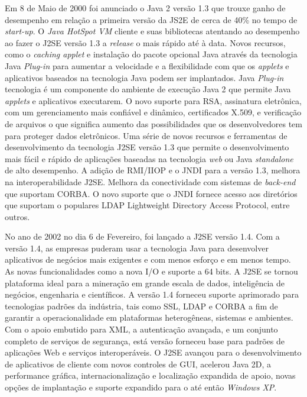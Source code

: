 Em 8 de Maio de 2000 foi anunciado o Java 2 versão 1.3 que trouxe ganho de desempenho em relação a primeira versão da JS2E de cerca de 40\%  no tempo de {\it  start-up}. O {\it Java HotSpot VM} cliente e suas bibliotecas atentando ao desempenho ao fazer o J2SE versão 1.3 a {\it release} o mais rápido até à data. Novos recursos, como o {\it caching applet} e instalação do pacote opcional Java através da tecnologia Java {\it  Plug-in} para aumentar a velocidade e a flexibilidade com que os {\it applets} e aplicativos baseados na tecnologia Java podem ser implantados. Java {\it  Plug-in} tecnologia é um componente do ambiente de execução Java 2 que permite Java {\it applets} e aplicativos executarem. O novo suporte para \acs{RSA}, assinatura eletrônica, com um gerenciamento mais confiável e dinâmico, certificados X.509, e verificação de arquivos o que significa aumento das possibilidades que os desenvolvedores tem para proteger dados eletrônicos. Uma série de novos recursos e ferramentas de desenvolvimento da tecnologia J2SE versão 1.3 que permite o desenvolvimento mais fácil e rápido de aplicações baseadas na tecnologia {\it web} ou Java {\it  standalone} de alto desempenho. A adição de RMI/IIOP e o JNDI para a versão 1.3, melhora na interoperabilidade J2SE. Melhora da conectividade com sistemas de {\it  back-end} que suportam CORBA. O novo suporte que o JNDI fornece acesso aos diretórios que suportam o populares LDAP Lightweight Directory Access Protocol, entre outros.


No ano de 2002 no dia 6 de Fevereiro, foi lançado a J2SE versão 1.4. Com a versão 1.4, as empresas puderam usar a tecnologia Java para desenvolver aplicativos de negócios mais exigentes e com menos esforço e em menos tempo. As novas funcionalidades como a nova I/O e suporte a 64 bits. A J2SE se tornou plataforma ideal para a mineração em grande escala de dados, inteligência de negócios, engenharia e científicos. A versão 1.4 forneceu suporte aprimorado para tecnologias padrões da indústria, tais como SSL, LDAP e CORBA a fim de garantir a operacionalidade em plataformas heterogêneas, sistemas e ambientes. Com o apoio embutido para XML, a autenticação avançada, e um conjunto completo de serviços de segurança, está versão forneceu base para padrões de aplicações Web e serviços interoperáveis. O J2SE avançou para o desenvolvimento de aplicativos de cliente com novos controles de GUI, acelerou Java 2D, a performance gráfica, internacionalização e localização expandida de apoio, novas opções de implantação e suporte expandido para o até então {\it Windows XP}.

